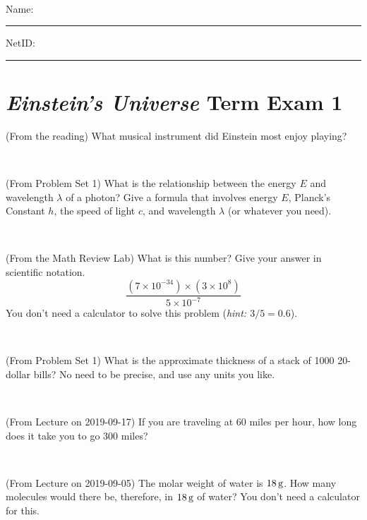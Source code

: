 \documentclass[12pt, letterpaper]{article}
\begin{document}
\vfill ~


\cleardoublepage



\noindent
Name: \rule[-1ex]{0.60\textwidth}{0.1pt}
NetID: \rule[-1ex]{0.20\textwidth}{0.1pt}

\section*{\textsl{Einstein's Universe} Term Exam 1}
\setcounter{problem}{1}


\begin{problem} (From the reading)
What musical instrument did Einstein most enjoy playing?
\end{problem}


\vfill ~

\begin{problem} (From Problem Set 1)
What is the relationship between the energy $E$ and wavelength
$\lambda$ of a photon? Give a formula that involves energy $E$,
Planck's Constant $h$, the speed of light $c$, and wavelength
$\lambda$ (or whatever you need).
\end{problem}

\vfill ~

\begin{problem} (From the Math Review Lab)
What is this number? Give your answer in scientific notation.
$$
\frac{(7\times10^{-34})\times(3\times10^8)}{5\times10^{-7}}
$$
You don't need a calculator to solve this problem (\textit{hint: $3/5=0.6$}).
\end{problem}


\vfill ~

\begin{problem} (From Problem Set 1)
What is the approximate thickness of a stack of 1000 20-dollar bills?
No need to be precise, and use any units you like.
\end{problem}


\vfill ~


\clearpage


\begin{problem} (From Lecture on 2019-09-17)
If you are traveling at 60 miles per hour, how long does
it take you to go 300 miles?
\end{problem}


\vfill ~

\begin{problem} (From Lecture on 2019-09-05)
The molar weight of water is $18\,\mathrm{g}$. How many molecules would there
be, therefore, in $18\,\mathrm{g}$ of water? You don't need a calculator for
this.
\end{problem}
\end{document}
